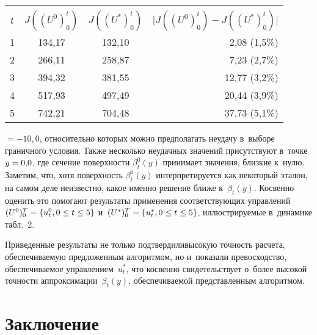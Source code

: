 \begin{multicols}{2}
\begin{center}
{\small
\tabcolsep=8pt
\begin{tabular}{|c|c|c|r|}
\hline
&&&\\[-9pt]
$t$&$J((U^0)_0^t)$&$J((U^*)_0^t)$&
\multicolumn{1}{c|}{$\vert J((U^0)_0^t) - J((U^*)_0^t)\vert$}\\
\hline
1&134,17&132,10&2,08 (1,5\%)\hspace*{8mm}\\
2&266,11&258,87&7,23 (2,7\%)\hspace*{8mm}\\
3&394,32&381,55&12,77 (3,2\%)\hspace*{8mm}\\
4&517,93&497,49&20,44 (3,9\%)\hspace*{8mm}\\
5&742,21&704,48&37,73 (5,1\%)\hspace*{8mm}\\
\hline
\end{tabular}
}
\end{center}


\vspace*{9pt}

     
     
     \noindent
      $=-10{,}0$, относительно которых можно предполагать неудачу 
в~выборе граничного условия. Также несколько неудачных значений 
присутствуют в~точке $y\hm=0{,}0$, где сечение поверхности $\beta_t^0(y)$ 
принимает значения, близкие к~нулю. Заметим, что, хотя поверхность 
$\beta_t^0(y)$ интерпретируется как некоторый эталон, на самом деле 
неизвестно, какое именно решение ближе к~$\beta_t(y)$. Косвенно оценить 
это помогают результаты применения соответствующих управлений 
$(U^0)_0^T\hm= \{ u_t^0, 0\hm\leq t\hm\leq 5\}$ и~$(U^*)_0^T\hm= \{ u_t^*, 
0\hm\leq t\hm\leq 5\}$, иллюстрируемые в~динамике табл.~2.
     

     Приведенные результаты не только подтвердили\linebreak высокую точ\-ность 
расчета, обеспечиваемую предложенным алгоритмом, но и~показали 
превосходство, обеспечиваемое управ\-ле\-ни\-ем~$u_t^*$, что косвенно 
свидетельствует о~более высокой точ\-ности аппрок\-си\-ма\-ции~$\beta_t(y)$, 
обеспечиваемой пред\-став\-лен\-ным алгоритмом.

\vspace*{-11pt}

\section{Заключение}


\end{multicols}
